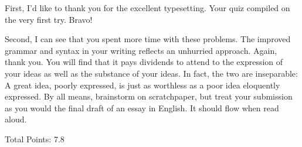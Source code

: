 \documentclass[11pt]{article}
\begin{document}
\begin{solution}
First, I'd like to thank you for the excellent typesetting.  Your quiz compiled on the very first try.  Bravo!

Second, I can see that you spent more time with these problems.  The improved grammar and syntax in your writing reflects an unhurried approach.  Again, thank you.  You will find that it pays dividends to attend to the expression of your ideas as well as the substance of your ideas.  In fact, the two are inseparable:  A great idea, poorly expressed, is just as worthless as a poor idea eloquently expressed.  By all means, brainstorm on scratchpaper, but treat your submission as you would the final draft of an essay in English.  It should flow when read aloud.

Total Points:  7.8
\end{solution}
\end{document}
